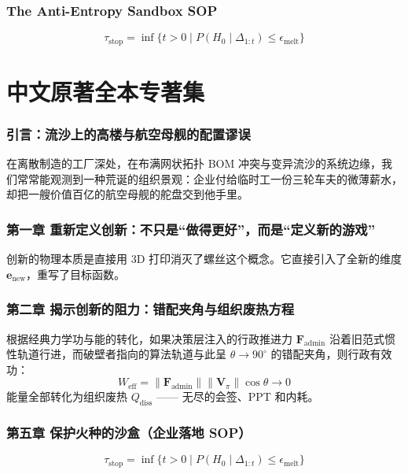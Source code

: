 \documentclass[11pt,a4paper]{article}
\begin{document}
\section{The Anti-Entropy Sandbox SOP}
\begin{equation}
\tau_{\text{stop}} = \inf \{ t > 0 \mid P(H_0 \mid \Delta_{1:t}) \le \epsilon_{\text{melt}} \}
\end{equation}

\newpage
\part{中文原著全本专著集}

\section{引言：流沙上的高楼与航空母舰的配置谬误}
在离散制造的工厂深处，在布满网状拓扑 BOM 冲突与变异流沙的系统边缘，我们常常能观测到一种荒诞的组织景观：企业付给临时工一份三轮车夫的微薄薪水，却把一艘价值百亿的航空母舰的舵盘交到他手里。

\section{第一章 重新定义创新：不只是“做得更好”，而是“定义新的游戏”}
创新的物理本质是直接用 3D 打印消灭了螺丝这个概念。它直接引入了全新的维度 $\mathbf{e}_{\text{new}}$，重写了目标函数。

\section{第二章 揭示创新的阻力：错配夹角与组织废热方程}
根据经典力学功与能的转化，如果决策层注入的行政推进力 $\mathbf{F}_{\text{admin}}$ 沿着旧范式惯性轨道行进，而破壁者指向的算法轨道与此呈 $\theta \to 90^\circ$ 的错配夹角，则行政有效功：
\begin{equation}
W_{\text{eff}} = \|\mathbf{F}_{\text{admin}}\| \|\mathbf{V}_\pi\| \cos \theta \to 0
\end{equation}
能量全部转化为组织废热 $Q_{\text{diss}}$ —— 无尽的会签、PPT 和内耗。

\section{第五章 保护火种的沙盒（企业落地 SOP）}
\begin{equation}
\tau_{\text{stop}} = \inf \{ t > 0 \mid P(H_0 \mid \Delta_{1:t}) \le \epsilon_{\text{melt}} \}
\end{equation}
\end{document}
